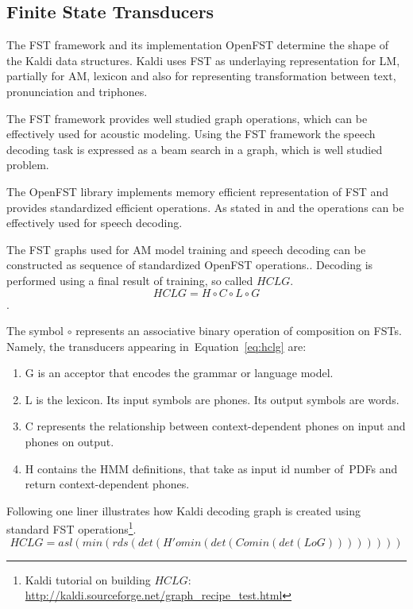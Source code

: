 {\subsection{Finite State Transducers} 
\label{sec:fst}
The \acl{FST} framework and its implementation OpenFST  determine the shape of the Kaldi data structures.
Kaldi uses \ac{FST} as underlaying representation for \ac{LM}, partially for \ac{AM}, lexicon and also for representing transformation between text, pronunciation and triphones.

The \ac{FST} framework provides well studied graph operations\cite{mohri2002weighted}, which can be effectively used for acoustic modeling.
Using the \ac{FST} framework the speech decoding task is expressed as a beam search in a graph, which is well studied problem.

The OpenFST library implements memory efficient representation of \ac{FST} and
provides standardized efficient operations.
As stated in \cite{mohri2002weighted} and \cite{povey2011kaldi} the operations can be effectively used
for speech decoding. 

The \ac{FST} graphs used for \ac{AM} model training and speech decoding can be constructed as sequence of standardized OpenFST operations.\cite{mohri2002weighted}.
Decoding is performed using a final result of training, so called  $HCLG$. 
\begin{equation} \label{eq:hclg}
HCLG = H\circ C\circ L\circ G
\end{equation}.

The symbol $\circ$ represents an associative binary operation of composition on \acp{FST}.
Namely, the transducers appearing in~Equation~\ref{eq:hclg} are:
\begin{enumerate}
    \item G is an acceptor that encodes the grammar or language model.
    \item L is the lexicon. Its input symbols are phones. Its output symbols are words.
    \item C represents the relationship between context-dependent phones on input and phones on output.
    \item H contains the \ac{HMM} definitions, that take as input id number of~\acp{PDF} and return context-dependent phones.
\end{enumerate}

Following one liner illustrates how Kaldi decoding graph is created using standard \ac{FST} operations\footnote{Kaldi tutorial on building $HCLG$: \url{http://kaldi.sourceforge.net/graph_recipe_test.html}}.\cite{mohri2002weighted}
\begin{equation}
   HCLG = asl(min(rds(det(H' o min(det(C o min(det(L o G)))))))) 
\end{equation}

}

